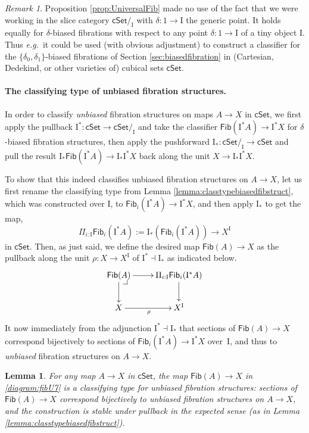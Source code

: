 \documentclass[11pt]{amsart}
\makeatletter
\newcommand{\eg}{\emph{e.g.}}
\newcommand{\cSet}{\ensuremath{\mathsf{cSet}}}
\newcommand{\ra}{\ensuremath{\rightarrow}}
\renewcommand{\to}{\ensuremath{\rightarrow}}
\newcommand{\too}{\ensuremath{\longrightarrow}}
\newcommand{\I}{\ensuremath{\mathrm{I}}}
\newcommand{\Fib}{\ensuremath{\mathsf{Fib}}}
\newtheorem{lemma}[theorem]{Lemma}
\theoremstyle{remark}
\newtheorem{remark}[theorem]{Remark}
\theoremstyle{definition}
\newcommand{\pbcorner}[1][dr]{\save*!/#1-1.2pc/#1:(-1,1)@^{|-}\restore}
\makeatother
\begin{document}
\begin{remark}
Proposition \ref{prop:UniversalFib} made no use of the fact that we were working in the slice category $\cSet/_\I$ with $\delta : 1\to\I$ the generic point. It holds equally for $\delta$-biased fibrations with respect to any point $\delta: 1\to\I$ of a tiny object $\I$.  Thus \eg\ it could be used (with obvious adjustment) to construct a classifier for the $\{\delta_0, \delta_1\}$-biased fibrations of Section \ref{sec:biasedfibration} in (Cartesian, Dedekind, or other varieties of) cubical sets $\cSet$.  
\end{remark}


\paragraph{The classifying type of unbiased fibration structures.}\label{par:classifyunbiasedfib} 

In order to classify \emph{unbiased} fibration structures on maps $A\to X$ in $\cSet$, we first apply the pullback $\I^*: \cSet \ra \cSet/_\I$ and take the classifier $\Fib(\I^*A)\ra \I^*X$ for $\delta$-biased fibration structures, then apply the pushforward $\I_*: \cSet/_\I \ra \cSet$ and pull the result   $\I_*\Fib(\I^*A)\ra \I_*\I^*X$ back along the unit  $X \to \I_*\I^*X$.  

To show that this indeed classifies unbiased fibration structures on $A\to X$, let us first rename the classifying type from Lemma \ref{lemma:classtypebiasedfibstruct}, which was constructed over $\I$, to $\Fib_i(\I^*A) \ra \I^{*}X$, and then apply $\I_*$ to get the map,
\[
\Pi_{i:\I}\Fib_i(\I^*A) := \I_*(\Fib_i(\I^*A)) \too X^\I
\]
in $\cSet$.  Then, as just said, we define the desired map $\Fib(A)\ra X$ as the pullback along the unit $\rho : X \ra X^\I$ of  $\I^*\dashv \I_*$ as indicated below.
\begin{equation}\label{diagram:fibU7}
\xymatrix{
 \Fib(A) \ar[d] \ar[r] \pbcorner & \ar[d] \Pi_{i:\I}\Fib_i(\I^*A) \\
 X \ar[r]_{\rho} &  X^\I
}
\end{equation}
It now immediately from the adjunction $\I^*\dashv \I_*$ that sections of $\Fib(A)\ra X$ correspond bijectively to sections of $\Fib_i (\I^*A)\ra \I^{*}X$ over~$\I$, and thus to \emph{unbiased} fibration structures on $A\to X$.

\begin{lemma}\label{lemma:classtypeunbiasedfibstruct}
For any map $A\ra X$ in $\cSet$, the map $\Fib(A)\ra X$ in \eqref{diagram:fibU7} is a \emph{classifying type for unbiased fibration structures}: sections of $\Fib(A)\ra X$ correspond bijectively to unbiased fibration structures on $A\ra X$, and the construction is stable under pullback in the expected sense (as in Lemma \ref{lemma:classtypebiasedfibstruct}).
\end{lemma}
\end{document}
